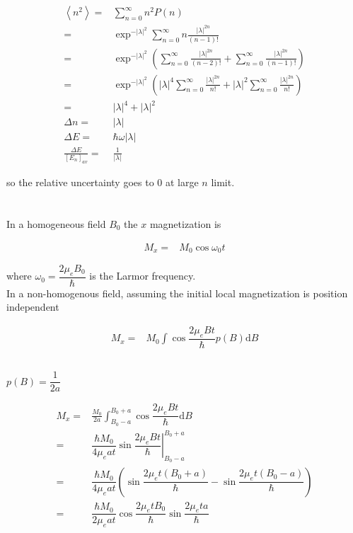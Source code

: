 \documentclass[10pt,fleqn]{article}
\newcommand{\ud}{\mathrm{d}}
\newcommand{\eqar}[1]
{
  \begin{align*}
    #1
  \end{align*}
}
\newcommand{\paren}[1]{{\left({#1}\right)}}
\newcommand{\abs}[1]{{\left|{#1}\right|}}
\newcommand{\sqr}[1]{{\left[{#1}\right]}}
\newcommand{\angl}[1]{{\left\langle{#1}\right\rangle}}
\begin{document}
\subsection{}
\eqar{
  \angl{n^2}=&\sum_{n=0}^\infty n^2P\paren{n}\\
  =&\exp^{-\abs{\lambda}^2}\sum_{n=0}^\infty n\frac{\abs{\lambda}^{2n}}{(n-1)!}\\
  =&\exp^{-\abs{\lambda}^2}\paren{\sum_{n=0}^\infty \frac{\abs{\lambda}^{2n}}{(n-2)!}+\sum_{n=0}^\infty \frac{\abs{\lambda}^{2n}}{(n-1)!}}\\
  =&\exp^{-\abs{\lambda}^2}\paren{\abs{\lambda}^4\sum_{n=0}^\infty \frac{\abs{\lambda}^{2n}}{n!}+\abs{\lambda}^2\sum_{n=0}^\infty \frac{\abs{\lambda}^{2n}}{n!}}\\
  =&\abs{\lambda}^4+\abs{\lambda}^2\\
  \Delta n=&\abs{\lambda}\\
  \Delta E=&\hbar\omega\abs{\lambda}\\
  \frac{\Delta E}{\sqr{E_n}_{av}}=&\frac{1}{\abs{\lambda}}
}
so the relative uncertainty goes to $0$ at large $n$ limit.
\section{}
In a homogeneous field $B_0$ the $x$ magnetization is
\eqar{
  M_x=&M_0\cos\omega_0t
}
where $\omega_0=\dfrac{2\mu_eB_0}{\hbar}$ is the Larmor frequency.\\
In a non-homogenous field, assuming the initial local magnetization is position
independent
\eqar{
  M_x=&M_0\int\cos\dfrac{2\mu_eBt}{\hbar}p(B)\ud B
}
\subsection{}
$p(B)=\dfrac{1}{2a}$
\eqar{
  M_x=&\frac{M_0}{2a}\int^{B_0+a}_{B_0-a}\cos\dfrac{2\mu_eBt}{\hbar}\ud B\\
  =&\dfrac{\hbar M_0}{4\mu_eat}\left.\sin\dfrac{2\mu_eBt}{\hbar}\right|^{B_0+a}_{B_0-a}\\
  =&\dfrac{\hbar M_0}{4\mu_eat}\paren{\sin\dfrac{2\mu_et(B_0+a)}{\hbar}-\sin\dfrac{2\mu_et(B_0-a)}{\hbar}}\\
  =&\dfrac{\hbar M_0}{2\mu_eat}\cos\dfrac{2\mu_etB_0}{\hbar}\sin\dfrac{2\mu_eta}{\hbar}
}
\subsection{}
\subsection{}
\end{document}
